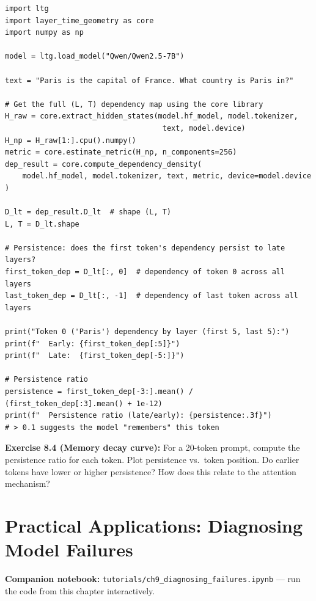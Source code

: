 \documentclass[11pt, twoside, openright]{memoir}
\newcommand{\notebook}[1]{%
  \begin{tcolorbox}[enhanced, colback=LBlue!30, colframe=Blue!60,
    left=4pt, right=4pt, top=3pt, bottom=3pt, boxrule=0.6pt, arc=2pt,
    before skip=6pt, after skip=10pt]
    {\small\sffamily\color{Navy} \textbf{Companion notebook:}
    \texttt{tutorials/#1} --- run the code from this chapter interactively.}
  \end{tcolorbox}%
}
\begin{document}
\begin{lstlisting}[caption={Measuring functional memory via dependency persistence}]
import ltg
import layer_time_geometry as core
import numpy as np

model = ltg.load_model("Qwen/Qwen2.5-7B")

text = "Paris is the capital of France. What country is Paris in?"

# Get the full (L, T) dependency map using the core library
H_raw = core.extract_hidden_states(model.hf_model, model.tokenizer,
                                    text, model.device)
H_np = H_raw[1:].cpu().numpy()
metric = core.estimate_metric(H_np, n_components=256)
dep_result = core.compute_dependency_density(
    model.hf_model, model.tokenizer, text, metric, device=model.device
)

D_lt = dep_result.D_lt  # shape (L, T)
L, T = D_lt.shape

# Persistence: does the first token's dependency persist to late layers?
first_token_dep = D_lt[:, 0]  # dependency of token 0 across all layers
last_token_dep = D_lt[:, -1]  # dependency of last token across all layers

print("Token 0 ('Paris') dependency by layer (first 5, last 5):")
print(f"  Early: {first_token_dep[:5]}")
print(f"  Late:  {first_token_dep[-5:]}")

# Persistence ratio
persistence = first_token_dep[-3:].mean() / (first_token_dep[:3].mean() + 1e-12)
print(f"  Persistence ratio (late/early): {persistence:.3f}")
# > 0.1 suggests the model "remembers" this token
\end{lstlisting}

\begin{tryit}
\textbf{Exercise 8.4 (Memory decay curve):} For a 20-token prompt, compute
the persistence ratio for each token. Plot persistence vs.\ token position.
Do earlier tokens have lower or higher persistence? How does this relate to
the attention mechanism?
\end{tryit}


\chapter{Practical Applications: Diagnosing Model Failures}
\label{chap:applications}

\notebook{ch9\_diagnosing\_failures.ipynb}
\end{document}
